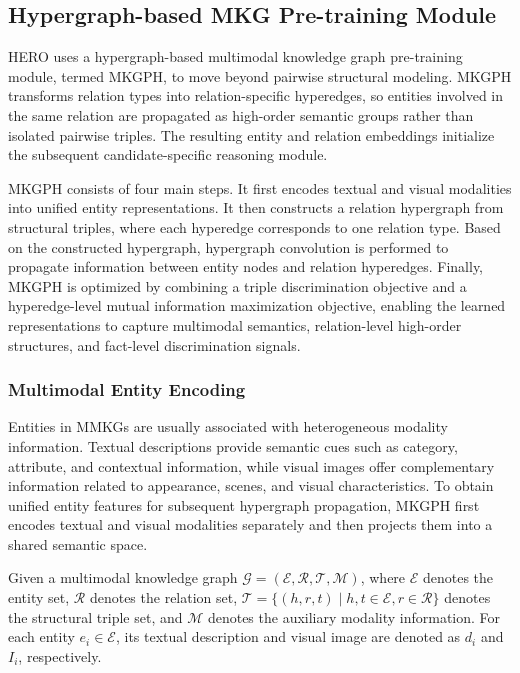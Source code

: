 \documentclass[a4paper,fleqn]{cas-sc}
\begin{document}
\subsection{Hypergraph-based MKG Pre-training Module}

HERO uses a hypergraph-based multimodal knowledge graph pre-training module, termed MKGPH, to move beyond pairwise structural modeling. MKGPH transforms relation types into relation-specific hyperedges, so entities involved in the same relation are propagated as high-order semantic groups rather than isolated pairwise triples. The resulting entity and relation embeddings initialize the subsequent candidate-specific reasoning module.

MKGPH consists of four main steps. It first encodes textual and visual modalities into unified entity representations. It then constructs a relation hypergraph from structural triples, where each hyperedge corresponds to one relation type. Based on the constructed hypergraph, hypergraph convolution is performed to propagate information between entity nodes and relation hyperedges. Finally, MKGPH is optimized by combining a triple discrimination objective and a hyperedge-level mutual information maximization objective, enabling the learned representations to capture multimodal semantics, relation-level high-order structures, and fact-level discrimination signals.

\subsubsection{Multimodal Entity Encoding}

Entities in MMKGs are usually associated with heterogeneous modality information. Textual descriptions provide semantic cues such as category, attribute, and contextual information, while visual images offer complementary information related to appearance, scenes, and visual characteristics. To obtain unified entity features for subsequent hypergraph propagation, MKGPH first encodes textual and visual modalities separately and then projects them into a shared semantic space.

Given a multimodal knowledge graph $\mathcal{G}=(\mathcal{E},\mathcal{R},\mathcal{T},\mathcal{M})$, where $\mathcal{E}$ denotes the entity set, $\mathcal{R}$ denotes the relation set, $\mathcal{T}=\{(h,r,t)\mid h,t\in\mathcal{E},r\in\mathcal{R}\}$ denotes the structural triple set, and $\mathcal{M}$ denotes the auxiliary modality information. For each entity $e_i\in\mathcal{E}$, its textual description and visual image are denoted as $d_i$ and $I_i$, respectively.
\end{document}
